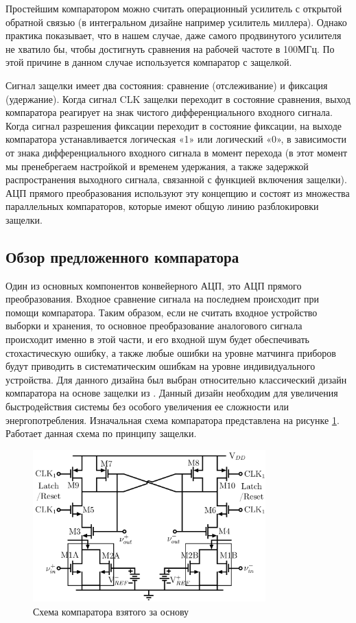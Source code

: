 \documentclass[a4paper,12pt]{article} %
\begin{document}
Простейшим компаратором можно считать операционный усилитель с открытой обратной связью (в интегральном дизайне например усилитель миллера). Однако практика показывает, что в нашем случае,  даже самого продвинутого усилителя не хватило бы, чтобы достигнуть сравнения на рабочей частоте в 100МГц. По этой причине в данном случае используется компаратор с защелкой. 


Сигнал защелки имеет два состояния: сравнение (отслеживание) и фиксация (удержание). Когда сигнал CLK защелки переходит в состояние сравнения, выход компаратора реагирует на знак чистого дифференциального входного сигнала. Когда сигнал разрешения фиксации переходит в состояние фиксации, на выходе компаратора устанавливается логическая «1» или логический «0», в зависимости от знака дифференциального входного сигнала в момент перехода (в этот момент мы пренебрегаем настройкой и временем удержания, а также задержкой распространения выходного сигнала, связанной с функцией включения защелки).  АЦП прямого преобразования используют эту концепцию и состоят из множества параллельных компараторов, которые имеют общую линию разблокировки защелки. 

\subsection{Обзор предложенного компаратора}

Один из основных компонентов конвейерного АЦП, это АЦП прямого преобразования. Входное сравнение сигнала на последнем происходит при помощи компаратора. Таким образом, если не считать входное устройство выборки и хранения, то основное преобразование аналогового сигнала происходит именно в этой части, и его входной шум будет обеспечивать стохастическую ошибку, а также любые ошибки на уровне матчинга приборов будут приводить в систематическим ошибкам на уровне индивидуального устройства.
Для данного дизайна был выбран относительно классический дизайн компаратора на основе защелки из \cite{op_amp_comp13}. Данный дизайн необходим для увеличения быстродействия системы без особого увеличения ее сложности или энергопотребления. Изначальная схема компаратора представлена на рисунке \ref{pic:pre_comparator}. Работает данная схема по принципу защелки.



\begin{figure}[]
    \includegraphics[width=0.8\textwidth]{pre_comparator.png}
    \caption{Схема компаратора взятого за основу}
    \label{pic:pre_comparator}
\end{figure}
\end{document}
